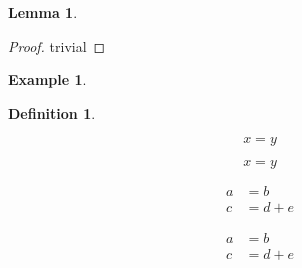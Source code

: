 \documentclass[a4paper,11pt,notitlepage,fullpage]{paper}
\theoremstyle{plain}
\newtheorem{lem}[thm]{Lemma}
\theoremstyle{definition}
\newtheorem{defn}[thm]{Definition} %
\newtheorem{exmp}[thm]{Example} %
\begin{document}
\begin{lem}

\end{lem}
\begin{proof} trivial \end{proof}


\begin{exmp}

\end{exmp}


\begin{defn}

\end{defn}



\begin{equation}
x = y
\end{equation}


\begin{equation*}
x = y
\end{equation*}


\begin{align}
a &= b \\
c &= d + e
\end{align}


\begin{align*}
a &= b \\
c &= d + e
\end{align*}





%
%
\end{document}

